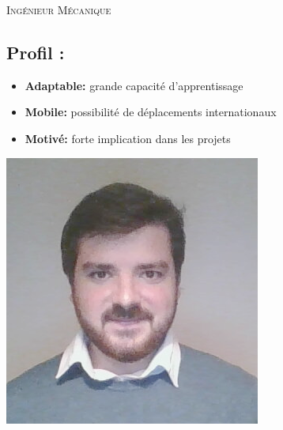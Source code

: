 \documentclass[10pt,a4paper,sans]{article}
\begin{document}

\begin{minipage}{0.36\textwidth}
    \vspace{0.30cm}
    
\end{minipage}
\begin{minipage}{0.62\textwidth}
    \begin{mdframed}[style=titre1]
        \begin{flushright}
            \LARGE{\textsc{Ingénieur Mécanique}}

        \end{flushright}
    \end{mdframed}
    \begin{minipage}{0.75\textwidth}
        \subsection{\large{Profil :}}
        \begin{itemize}
            \item{\textbf{Adaptable:} grande capacité d'apprentissage}
            \item{\textbf{Mobile:} possibilité de déplacements internationaux}
            \item{\textbf{Motivé:} forte implication dans les projets}
        \end{itemize}
    \end{minipage}
    \begin{minipage}{0.23\textwidth}
        \includegraphics[width=\textwidth]{img/image_CV.png}
    \end{minipage}
\end{minipage}
\end{document}
